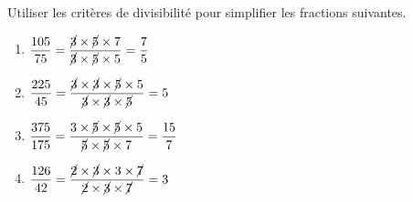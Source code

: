     Utiliser les critères de divisibilité pour simplifier les fractions suivantes.

    \begin{enumerate}
        \item $\dfrac{105}{75}=\dfrac{\cancel{3}\times\cancel{5}\times7}{\cancel{3}\times\cancel{5}\times5}=\dfrac{7}{5}$
        \item $\dfrac{225}{45}=\dfrac{\cancel{3}\times\cancel{3}\times\cancel{5}\times5}{\cancel{3}\times\cancel{3}\times\cancel{5}}=5$
        \item $\dfrac{375}{175}=\dfrac{3\times\cancel{5}\times\cancel{5}\times5}{\cancel{5}\times\cancel{5}\times7}=\dfrac{15}{7}$
        \item $\dfrac{126}{42}=\dfrac{\cancel{2}\times\cancel{3}\times3\times\cancel{7}}{\cancel{2}\times\cancel{3}\times\cancel{7}}=3$
    \end{enumerate}
